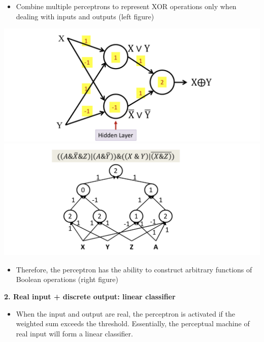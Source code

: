 \documentclass{article}
\begin{document}
	
	\begin{itemize}
		\item Combine multiple perceptrons to represent XOR operations only when dealing with inputs and outputs (left figure)
	\end{itemize}


		\includegraphics[scale=0.2]{3.png}
		\includegraphics[scale=0.2]{4.png}

		
		
		\begin{itemize}
			\item Therefore, the perceptron has the ability to construct arbitrary functions of Boolean operations (right figure)
		\end{itemize}
		
		
		
	\textbf{2. Real input + discrete output: linear classifier}
	
		
		
		\begin{itemize}
			\item When the input and output are real, the perceptron is activated if the weighted sum exceeds the threshold. Essentially, the perceptual machine of real input will form a linear classifier.
		\end{itemize}
	
\end{document}
